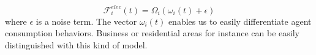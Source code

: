 \documentclass[journal]{IEEEtran}
\begin{document}
\begin{equation}
\mathcal{F}_{i}^{elec}(t) = \Omega_{i} ( \omega_{i}(t) + \epsilon )
\end{equation}
where $ \epsilon $ is a noise term. The vector $ \omega_{i}(t) $ enables us to easily differentiate agent consumption behaviors. Business or residential areas for instance can be easily distinguished with this kind of model.

  

\end{document}
